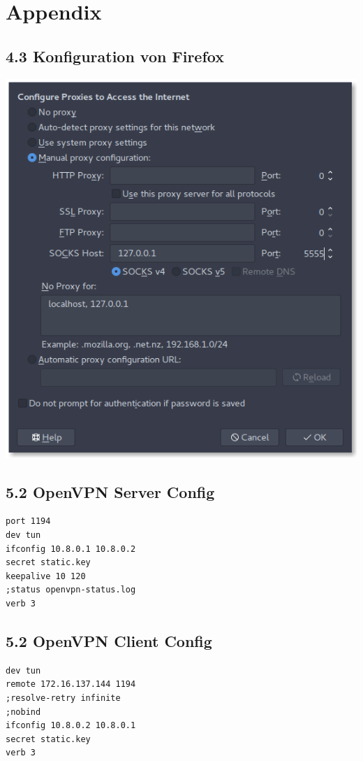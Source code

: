 \documentclass[10pt,a4paper]{article}
\begin{document}
\newpage
\section*{Appendix}
\subsection*{4.3 Konfiguration von Firefox}
\includegraphics[width=\textwidth]{images/image.png}

\subsection*{5.2 OpenVPN Server Config}
\begin{verbatim}
port 1194
dev tun
ifconfig 10.8.0.1 10.8.0.2
secret static.key
keepalive 10 120
;status openvpn-status.log
verb 3
\end{verbatim}
\subsection*{5.2 OpenVPN Client Config}
\begin{verbatim}
dev tun
remote 172.16.137.144 1194
;resolve-retry infinite
;nobind
ifconfig 10.8.0.2 10.8.0.1
secret static.key
verb 3
\end{verbatim}
\end{document}
